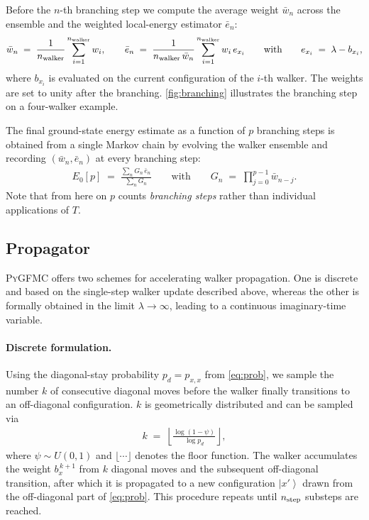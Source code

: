 \documentclass{SciPost}
\newcommand{\nbra}{n_{\rm step}}
\newcommand{\nwalker}{n_{\rm walker}}
\providecommand{\ket}[1]{\left|#1\right\rangle}
\providecommand{\PyGFMC}{\textsc{PyGFMC}}
\begin{document}
Before the $n$-th branching step we compute the average weight $\bar{w}_n$ across the ensemble and the weighted local-energy estimator $\bar{e}_n$:
\begin{align}
	\bar{w}_n \;=\; \frac{1}{\nwalker} \sum_{i=1}^{\nwalker} w_i,
	\qquad
	\bar{e}_n \;=\; \frac{1}{\nwalker\,\bar{w}_n}
		\sum_{i=1}^{\nwalker} w_i\, e_{x_i}
	\qquad\text{with}\qquad
	e_{x_i} \;=\; \lambda - b_{x_i},\label{eq:avg_weight}
\end{align}
where $b_{x_i}$ is evaluated on the current configuration of the $i$-th walker.
%
The weights are set to unity after the branching.
%
\autoref{fig:branching} illustrates the branching step on a four-walker example.

The final ground-state energy estimate as a function of $p$ branching steps is obtained from a single Markov chain by evolving the walker ensemble and recording $(\bar{w}_n, \bar{e}_n)$ at every branching step:
\begin{align}
	E_0[p] \;=\; \frac{\sum_n G_n\, \bar{e}_n}{\sum_n G_n}
	\qquad\text{with}\qquad
	G_n \;=\; \prod_{j=0}^{p-1} \bar{w}_{n-j}.\label{eq:E0}
\end{align}
Note that from here on $p$ counts \emph{branching steps} rather than individual applications of $T$.

\subsection{Propagator}\label{sec:gfmc:cont_time}
\PyGFMC{} offers two schemes for accelerating walker propagation.
%
One is discrete and based on the single-step walker update described above, whereas the other is formally obtained in the limit $\lambda \to \infty$, leading to a continuous imaginary-time variable.

\paragraph{Discrete formulation.}  
Using the diagonal-stay probability $p_d=p_{x,x}$ from \autoref{eq:prob}, we sample the number $k$ of consecutive diagonal moves before the walker finally transitions to an off-diagonal configuration.
%
$k$ is geometrically distributed and can be sampled via
\begin{align}
	k \;=\; \left\lfloor \frac{\log(1-\psi)}{\log p_d} \right\rfloor,
	\label{eq:cont_time_discrete_k}
\end{align}
where $\psi \sim U(0,1)$ and $\lfloor \cdots \rfloor$ denotes the floor function.
%
The walker accumulates the weight $b_x^{\,k+1}$ from $k$ diagonal moves and the subsequent off-diagonal transition, after which it is propagated to a new configuration $\ket{x'}$ drawn from the off-diagonal part of \autoref{eq:prob}.
%
This procedure repeats until $\nbra$ substeps are reached.
\end{document}
